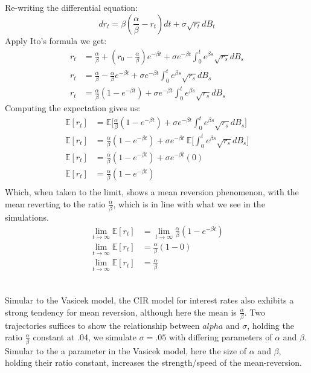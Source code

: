 \documentclass[a4paper,12pt]{article}
\begin{document}
\subsection{}
Re-writing the differential equation:
$$
dr_t = \beta(\frac{\alpha}{\beta} - r_t)dt + \sigma \sqrt{r_t}dB_t
$$
Apply Ito's formula we get:
%
\begin{align*}
r_t &= \frac{\alpha}{\beta} + (r_0 - \frac{\alpha}{\beta})e^{- \beta t} + \sigma e^{- \beta t} \int_0^t e^{\beta s} \sqrt{r_s} dB_s \\
r_t &= \frac{\alpha}{\beta} - \frac{\alpha}{\beta}e^{- \beta t} + \sigma e^{- \beta t} \int_0^t e^{\beta s} \sqrt{r_s} dB_s \\
r_t &= \frac{\alpha}{\beta}(1 - e^{- \beta t}) + \sigma e^{- \beta t} \int_0^t e^{\beta s} \sqrt{r_s} dB_s
\end{align*}
%
Computing the expectation gives us:
\begin{align*}
\mathbb{E}[r_t] &= \mathbb{E} \bigg[ \frac{\alpha}{\beta}(1 - e^{-\beta t}) + \sigma e^{-\beta t} \int_0^te^{\beta s}\sqrt{r_s}dB_s \bigg] \\
\mathbb{E}[r_t] &= \frac{\alpha}{\beta}(1 - e^{-\beta t}) + \sigma e^{-\beta t} \ \mathbb{E} \bigg[ \int_0^te^{\beta s}\sqrt{r_s}dB_s \bigg] \\
\mathbb{E}[r_t] &= \frac{\alpha}{\beta}(1 - e^{-\beta t}) + \sigma e^{-\beta t} (0) \\
\mathbb{E}[r_t] &= \frac{\alpha}{\beta}(1 - e^{-\beta t}) \\
\end{align*}
Which, when taken to the limit, shows a mean reversion phenomenon, with the mean reverting to the ratio $\frac{\alpha}{\beta}$, which is in line with what we see in the simulations.
\begin{align*}
\lim_{t \rightarrow \infty} \mathbb{E}[r_t] &=  \lim_{t \rightarrow \infty} \frac{\alpha}{\beta}(1 - e^{-\beta t}) \\
\lim_{t \rightarrow \infty} \mathbb{E}[r_t] &=  \frac{\alpha}{\beta}(1 - 0) \\
\lim_{t \rightarrow \infty} \mathbb{E}[r_t] &=  \frac{\alpha}{\beta} \\
\end{align*}
%


\subsection{}
Simular to the Vasicek model, the CIR model for interest rates also exhibits a strong tendency for mean reversion, although here the mean is $\frac{\alpha}{\beta}$. Two trajectories suffices to show the relationship between $alpha$ and $\sigma$, holding the ratio $\frac{\alpha}{\beta}$ constant at .04, we simulate $\sigma = .05$ with differing parameters of $\alpha$ and $\beta$. Simular to the a parameter in the Vasicek model, here the size of $\alpha$ and $\beta$, holding their ratio constant, increases the strength/speed of the mean-reversion.
\end{document}
